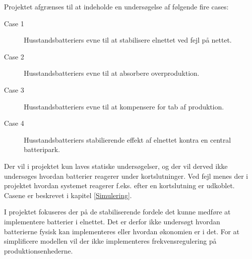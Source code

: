 
\label{Afgraensning}

Projektet afgrænses til at indeholde en undersøgelse af følgende fire cases:

\begin{description}
	\item[Case 1] Husstandsbatteriers evne til at stabilisere elnettet ved fejl på nettet.
	\item[Case 2] Husstandsbatteriers evne til at absorbere overproduktion.
	\item[Case 3] Husstandsbatteriers evne til at kompensere for tab af produktion.
	\item[Case 4] Husstandsbatteriers stabilierende effekt af elnettet kontra en central batteripark.
\end{description}	
	
Der vil i projektet kun laves statiske undersøgelser, og der vil derved ikke undersøges hvordan batterier reagerer under kortslutninger. Ved fejl menes der i projektet hvordan systemet reagerer f.eks. efter en kortslutning er udkoblet. Casene er beskrevet i kapitel \ref{Simulering}.  
 

I projektet fokuseres der på de stabiliserende fordele det kunne medføre at implementere batterier i elnettet. Det er derfor ikke undersøgt hvordan batterierne fysisk kan implementeres eller hvordan økonomien er i det. For at simplificere modellen vil der ikke implementeres frekvensregulering på produktionsenhederne.
